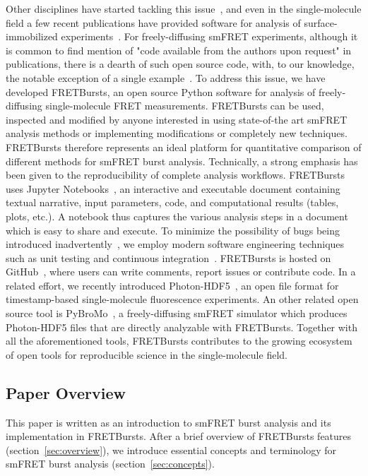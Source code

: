 Other disciplines have started tackling this issue~\cite{Eglen_2016},
and even in the single-molecule field a few recent publications have provided 
software for analysis of surface-immobilized experiments~\cite{McKinney_2006,Bronson_2009,Greenfeld_2012,K_nig_2013,van_de_Meent_2014}.
For freely-diffusing smFRET experiments, although it is common to find mention of 
"code available from the authors upon request" in publications, there is a dearth 
of such open source code, with, to our knowledge, the notable exception of a single 
example~\cite{Murphy2014}.
To address this issue, we have developed FRETBursts,
an open source Python software for analysis of freely-diffusing single-molecule FRET measurements.
FRETBursts can be used, inspected and modified by anyone interested in using 
state-of-the art smFRET analysis methods or implementing modifications or completely new techniques. 
FRETBursts therefore represents an ideal platform
for quantitative comparison of different methods for smFRET burst analysis.
Technically, a strong emphasis has been given to the reproducibility of complete analysis
workflows. FRETBursts uses Jupyter Notebooks~\cite{Shen_2014},
an interactive and executable document containing textual narrative, input parameters, 
code, and computational results (tables, plots, etc.). A notebook thus captures the various analysis steps
in a document which is easy to share and execute.
To minimize the possibility of bugs being introduced inadvertently~\cite{Soergel_2015}, 
we employ modern software engineering techniques
such as unit testing and continuous integration~\cite{Wilson_2014,Eglen_2016}.
FRETBursts is hosted on GitHub~\cite{Blischak_2016,Prli__2012},
where users can write comments, report issues or contribute code.
In a related effort, we recently introduced Photon-HDF5~\cite{Ingargiola2016},
an open file format for timestamp-based single-molecule fluorescence
experiments. An other related open source tool is PyBroMo~\cite{Ingargiola_2016},
a freely-diffusing smFRET simulator which produces Photon-HDF5 files that are
directly analyzable with FRETBursts.
Together with all the aforementioned tools, FRETBursts contributes to the growing 
ecosystem of open tools for reproducible science in the single-molecule field.

\subsection{Paper Overview}
This paper is written as an introduction to smFRET burst analysis and 
its implementation in FRETBursts.
After a brief overview of FRETBursts features (section~\ref{sec:overview}),
we introduce essential concepts and terminology for smFRET burst analysis 
(section~\ref{sec:concepts}).

